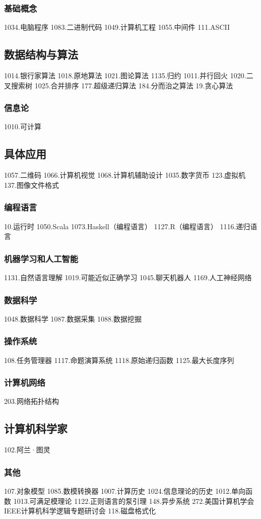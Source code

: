 \subsubsection{基础概念}
1034.电脑程序
1083.二进制代码
1049.计算机工程
1055.中间件
111.ASCII
\subsection{数据结构与算法}
1014.银行家算法
1018.原地算法
1021.图论算法
1135.归约
1011.并行回火
1020.二叉搜索树
1025.合并排序
177.超级递归算法
184.分而治之算法
19.贪心算法
\subsubsection{信息论}
1010.可计算
\subsection{具体应用}
1057.二维码
1066.计算机视觉
1068.计算机辅助设计
1035.数字货币
123.虚拟机
137.图像文件格式
\subsubsection{编程语言}
10.运行时
1050.Scala
1073.Haskell（编程语言）
1127.R（编程语言）
1116.递归语言
\subsubsection{机器学习和人工智能}
1131.自然语言理解
1019.可能近似正确学习
1045.聊天机器人
1169.人工神经网络
\subsubsection{数据科学}
1048.数据科学
1087.数据采集
1088.数据挖掘
\subsubsection{操作系统}
108.任务管理器
1117.命题演算系统
1118.原始递归函数
1125.最大长度序列
\subsubsection{计算机网络}
203.网络拓扑结构
\subsection{计算机科学家}
102.阿兰·图灵
\subsubsection{其他}
107.对象模型
1085.数模转换器
1007.计算历史
1024.信息理论的历史
1012.单向函数
1013.可满足模理论
1122.正则语言的泵引理
148.异步系统
272.美国计算机学会IEEE计算机科学逻辑专题研讨会
118.磁盘格式化

